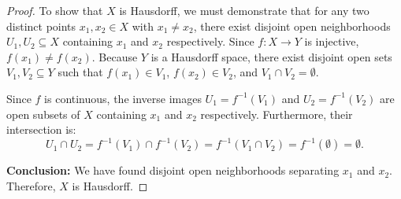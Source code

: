 
\begin{proof}
To show that $X$ is Hausdorff, we must demonstrate that for any two distinct points
$x_1,x_2\in X$ with $x_1\neq x_2$, there exist disjoint open neighborhoods
$U_1,U_2\subseteq X$ containing $x_1$ and $x_2$ respectively. Since $f\colon X\to Y$ is
injective, $f(x_1)\neq f(x_2)$. Because $Y$ is a Hausdorff space, there exist disjoint open sets
$V_1,V_2\subseteq Y$ such that $f(x_1)\in V_1$, $f(x_2)\in V_2$, and $V_1\cap V_2=\emptyset$.

Since $f$ is continuous, the inverse images $U_1=f^{-1}(V_1)$ and $U_2=f^{-1}(V_2)$ are open
subsets of $X$ containing $x_1$ and $x_2$ respectively. Furthermore, their intersection is:
\[ U_1\cap U_2=f^{-1}(V_1)\cap f^{-1}(V_2)=f^{-1}(V_1\cap V_2)=f^{-1}(\emptyset)=\emptyset. \]

\textbf{Conclusion:} We have found disjoint open neighborhoods separating $x_1$ and $x_2$.
Therefore, $X$ is Hausdorff.
\end{proof}
